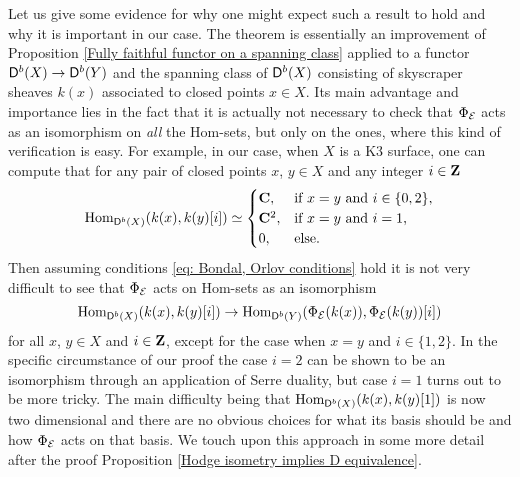 Let us give some evidence for why one might expect such a result to hold and why it is important in our case. The theorem is essentially an improvement of Proposition \ref{Fully faithful functor on a spanning class} applied to a functor $\mathsf{D}^b(X) \to \mathsf{D}^b(Y)$ and the spanning class of $\mathsf{D}^b(X)$ consisting of skyscraper sheaves $k(x)$ associated to closed points $x \in X$. Its main advantage and importance lies in the fact that it is actually not necessary 
to check that $\Phi_{\mathcal E}$ acts as an isomorphism on \emph{all} the Hom-sets, but only on the ones, where this kind of verification is easy. For example, in our case, when $X$ is a K3 surface, one can compute that 
for any pair of closed points $x$, $y \in X$ and any integer $i \in \mathbf Z$
\begin{equation}
        \operatorname{Hom}_{\mathsf{D}^b(X)}(k(x), k(y)[i]) \simeq \begin{cases}
            \mathbf C, &\text{if $x = y$ and $i \in \{0, 2\}$,} \\
            \mathbf C^2, &\text{if $x = y$ and $i = 1$,} \\
            0, &\text{else.}
        \end{cases}
\end{equation}
Then assuming conditions \eqref{eq: Bondal, Orlov conditions} hold it is not very difficult to see that $\Phi_{\mathcal E}$ acts on Hom-sets as an isomorphism
\[
    \operatorname{Hom}_{\mathsf{D}^b(X)}(k(x), k(y)[i]) \to  \operatorname{Hom}_{\mathsf{D}^b(Y)}(\Phi_{\mathcal E}(k(x)), \Phi_{\mathcal E}(k(y))[i])
\] 
for all $x$, $y \in X$ and $i \in \mathbf Z$, except for the case when $x = y$ and $i \in \{1,2\}$. In the specific circumstance of our proof the case $i = 2$ can be shown to be an isomorphism through an application of Serre duality, but case $i = 1$ turns out to be more tricky. The main difficulty being that $\operatorname{Hom}_{\mathsf{D}^b(X)}(k(x), k(y)[1])$ is now two dimensional and there are no obvious choices for what its basis should be and how $\Phi_{\mathcal E}$ acts on that basis. We touch upon this approach in some more detail after the proof Proposition \ref{Hodge isometry implies D equivalence}. 

\vspace{0.3cm}


